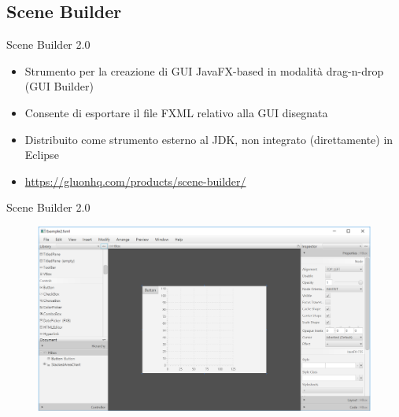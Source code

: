 \documentclass[xcolor=dvipsnames,presentation]{beamer}
\begin{document}
%
%
%
%
%
%


\subsection{Scene Builder}

\begin{frame}{Scene Builder 2.0}
\begin{itemize}\itemsep10pt
\item Strumento per la creazione di GUI JavaFX-based in modalità drag-n-drop (GUI Builder)
\item Consente di esportare il file FXML relativo alla GUI disegnata
\item Distribuito come strumento esterno al JDK, non integrato (direttamente) in Eclipse
\item \url{https://gluonhq.com/products/scene-builder/}
\end{itemize}
\end{frame}

\begin{frame}{Scene Builder 2.0}
\begin{figure}
\includegraphics[width=\textwidth]{img/scenebuilder.png}
\end{figure}
\end{frame}

%
\end{document}

